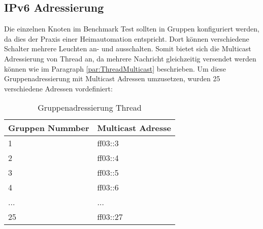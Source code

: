 \subsection{IPv6 Adressierung}\label{subsec:IPv6Adressierung}
Die einzelnen Knoten im Benchmark Test sollten in Gruppen konfiguriert werden, da dies der Praxis einer Heimautomation entspricht. Dort können verschiedene Schalter mehrere Leuchten an- und ausschalten. Somit bietet sich die Multicast Adressierung von Thread an, da mehrere Nachricht gleichzeitig versendet werden können wie im Paragraph \ref{par:ThreadMulticast} beschrieben. Um diese Gruppenadressierung mit Multicast Adressen umzusetzen, wurden 25 verschiedene Adressen vordefiniert:

\begin{table}[H]
	\centering
	\begin{tabular}{|l|l|}
		\hline
		\textbf{Gruppen Nummber} & \textbf{Multicast Adresse} \\ \hline
		1                        & ff03::3                    \\ \hline
		2                        & ff03::4                    \\ \hline
		3                        & ff03::5                    \\ \hline
		4                        & ff03::6                    \\ \hline
		...                      & ...                        \\ \hline
		25                       & ff03::27                   \\ \hline
	\end{tabular}
	\caption{Gruppenadressierung Thread}
	\label{table:GruppenadressierungThread}
\end{table}